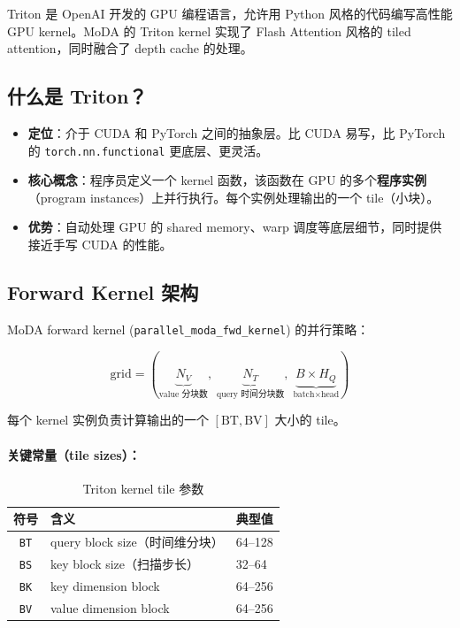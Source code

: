 \documentclass[11pt,a4paper]{article}
\begin{document}
Triton 是 OpenAI 开发的 GPU 编程语言，允许用 Python 风格的代码编写高性能 GPU kernel。MoDA 的 Triton kernel 实现了 Flash Attention 风格的 tiled attention，同时融合了 depth cache 的处理。

\subsection{什么是 Triton？}

\begin{itemize}
  \item \textbf{定位}：介于 CUDA 和 PyTorch 之间的抽象层。比 CUDA 易写，比 PyTorch 的 \texttt{torch.nn.functional} 更底层、更灵活。
  \item \textbf{核心概念}：程序员定义一个 kernel 函数，该函数在 GPU 的多个\textbf{程序实例}（program instances）上并行执行。每个实例处理输出的一个 tile（小块）。
  \item \textbf{优势}：自动处理 GPU 的 shared memory、warp 调度等底层细节，同时提供接近手写 CUDA 的性能。
\end{itemize}

\subsection{Forward Kernel 架构}

MoDA forward kernel (\texttt{parallel\_moda\_fwd\_kernel}) 的并行策略：

\begin{equation}
  \text{grid} = (\underbrace{N_V}_{\text{value 分块数}},\; \underbrace{N_T}_{\text{query 时间分块数}},\; \underbrace{B \times H_Q}_{\text{batch} \times \text{head}})
\end{equation}

每个 kernel 实例负责计算输出的一个 $[\text{BT}, \text{BV}]$ 大小的 tile。

\paragraph{关键常量（tile sizes）：}
\begin{table}[h]
\centering
\begin{tabular}{cll}
\toprule
符号 & 含义 & 典型值 \\
\midrule
\texttt{BT} & query block size（时间维分块） & 64--128 \\
\texttt{BS} & key block size（扫描步长） & 32--64 \\
\texttt{BK} & key dimension block & 64--256 \\
\texttt{BV} & value dimension block & 64--256 \\
\bottomrule
\end{tabular}
\caption{Triton kernel tile 参数}
\end{table}
\end{document}
